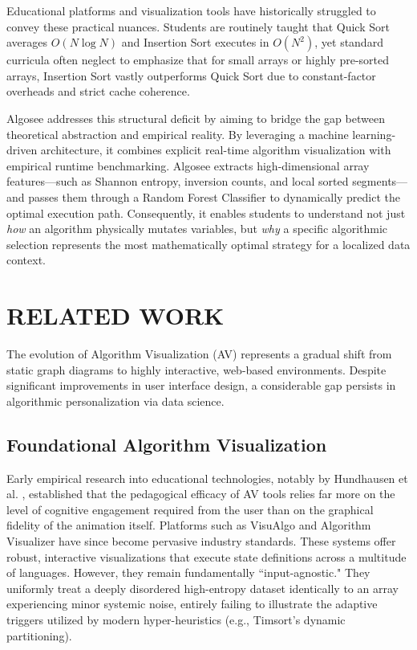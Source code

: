 \documentclass[conference]{IEEEtran}
\begin{document}
Educational platforms and visualization tools have historically struggled to convey these practical nuances. Students are routinely taught that Quick Sort averages $O(N \log N)$ and Insertion Sort executes in $O(N^2)$, yet standard curricula often neglect to emphasize that for small arrays or highly pre-sorted arrays, Insertion Sort vastly outperforms Quick Sort due to constant-factor overheads and strict cache coherence.

Algosee addresses this structural deficit by aiming to bridge the gap between theoretical abstraction and empirical reality. By leveraging a machine learning-driven architecture, it combines explicit real-time algorithm visualization with empirical runtime benchmarking. Algosee extracts high-dimensional array features---such as Shannon entropy, inversion counts, and local sorted segments---and passes them through a Random Forest Classifier to dynamically predict the optimal execution path. Consequently, it enables students to understand not just \textit{how} an algorithm physically mutates variables, but \textit{why} a specific algorithmic selection represents the most mathematically optimal strategy for a localized data context. 

\section{RELATED WORK}
The evolution of Algorithm Visualization (AV) represents a gradual shift from static graph diagrams to highly interactive, web-based environments. Despite significant improvements in user interface design, a considerable gap persists in algorithmic personalization via data science.

\subsection{Foundational Algorithm Visualization}
Early empirical research into educational technologies, notably by Hundhausen et al. \cite{hundhausen2002meta}, established that the pedagogical efficacy of AV tools relies far more on the level of cognitive engagement required from the user than on the graphical fidelity of the animation itself. Platforms such as VisuAlgo \cite{halim2012visualgo} and Algorithm Visualizer have since become pervasive industry standards. These systems offer robust, interactive visualizations that execute state definitions across a multitude of languages. However, they remain fundamentally ``input-agnostic." They uniformly treat a deeply disordered high-entropy dataset identically to an array experiencing minor systemic noise, entirely failing to illustrate the adaptive triggers utilized by modern hyper-heuristics (e.g., Timsort's dynamic partitioning).
\end{document}
